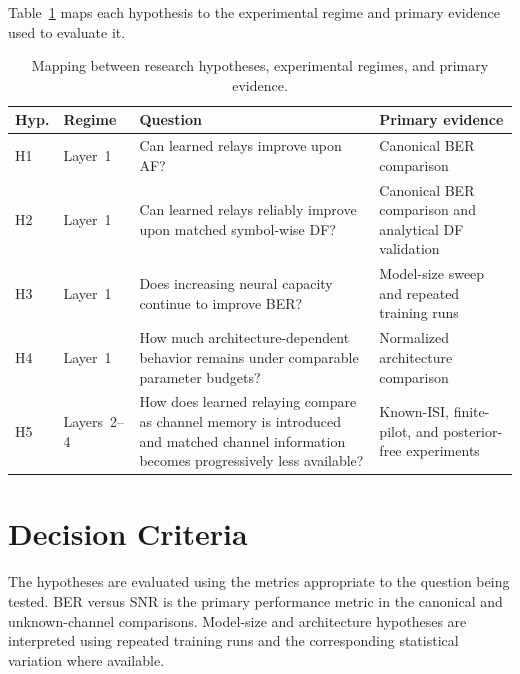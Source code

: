 Table~\ref{tbl:hypothesis-experiment-map} maps each hypothesis to the
experimental regime and primary evidence used to evaluate it.

\begin{table}[htbp]
\centering
\caption{Mapping between research hypotheses, experimental regimes, and
primary evidence.}
\label{tbl:hypothesis-experiment-map}
\begin{tabular}{@{}p{}p{}
                p{}p{}@{}}
\toprule
\textbf{Hyp.} &
\textbf{Regime} &
\textbf{Question} &
\textbf{Primary evidence} \\
\midrule

H1 &
Layer~1 &
Can learned relays improve upon AF? &
Canonical BER comparison \\

H2 &
Layer~1 &
Can learned relays reliably improve upon matched symbol-wise DF? &
Canonical BER comparison and analytical DF validation \\

H3 &
Layer~1 &
Does increasing neural capacity continue to improve BER? &
Model-size sweep and repeated training runs \\

H4 &
Layer~1 &
How much architecture-dependent behavior remains under comparable parameter
budgets? &
Normalized architecture comparison \\

H5 &
Layers~2--4 &
How does learned relaying compare as channel memory is introduced and matched
channel information becomes progressively less available? &
Known-ISI, finite-pilot, and posterior-free experiments \\

\bottomrule
\end{tabular}
\end{table}


\section{Decision Criteria}
\label{sec:hypothesis-decision-criteria}

The hypotheses are evaluated using the metrics appropriate to the question
being tested. BER versus SNR is the primary performance metric in the
canonical and unknown-channel comparisons. Model-size and architecture
hypotheses are interpreted using repeated training runs and the corresponding
statistical variation where available.

